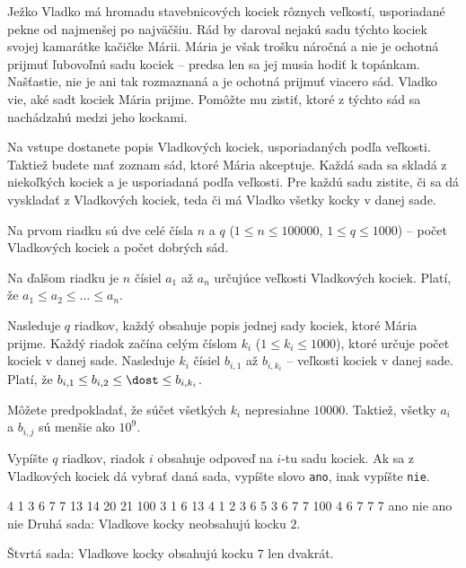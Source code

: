 




Ježko Vladko má hromadu stavebnicových kociek rôznych veľkostí, usporiadané pekne od najmenšej po
najväčšiu. Rád by daroval nejakú sadu týchto kociek svojej kamarátke kačičke Márii. Mária je však
trošku náročná a nie je ochotná prijmuť ľubovoľnú sadu kociek -- predsa len sa jej musia hodiť k
topánkam. Našťastie, nie je ani tak rozmaznaná a je ochotná prijmuť viacero sád. Vladko vie, aké
sadt kociek Mária prijme. Pomôžte mu zistiť, ktoré z týchto sád sa nachádzahú medzi jeho kockami.


Na vstupe dostanete popis Vladkových kociek, usporiadaných podľa veľkosti. Taktiež budete mať zoznam
sád, ktoré Mária akceptuje. Každá sada sa skladá z niekoľkých kociek a je usporiadaná podľa veľkosti.
Pre každú sadu zistite, či sa dá vyskladať z Vladkových kociek, teda či má Vladko všetky kocky v
danej sade.


Na prvom riadku sú dve celé čísla $n$ a $q$ ($1 \leq n \leq 100000$, $1 \leq q \leq 1000$) -- počet
Vladkových kociek a počet dobrých sád.

Na ďalšom riadku je $n$ čísiel $a_1$ až $a_n$ určujúce veľkosti Vladkových kociek. Platí, že $a_1
\leq a_2 \leq \dots \leq a_n$.

Nasleduje $q$ riadkov, každý obsahuje popis jednej sady kociek, ktoré Mária prijme. Každý riadok
začína celým číslom $k_i$ ($1 \leq k_i \leq 1000$), ktoré určuje počet kociek v danej sade. Nasleduje $k_i$ čísiel
$b_{i,1}$  až $b_{i,k_i}$ -- veľkosti kociek v danej sade. Platí, že $b_{i,1} \leq b_{i,2} \leq \dost
\leq b_{i,k_i}$.

Môžete predpokladať, že súčet všetkých $k_i$ nepresiahne $10000$. Taktiež, všetky $a_i$ a $b_{i,j}$
sú menšie ako $10^9$.


Vypíšte $q$ riadkov, riadok $i$ obsahuje odpoveď na $i$-tu sadu kociek. Ak sa z Vladkových kociek dá
vybrať daná sada, vypíšte slovo \texttt{ano}, inak vypíšte \texttt{nie}.


 4
1 3 6 7 7 13 14 20 21 100
3 1 6 13
4 1 2 3 6
5 3 6 7 7 100
4 6 7 7 7
\vystup
ano
nie
ano
nie
\komentar
Druhá sada: Vladkove kocky neobsahujú kocku $2$.

Štvrtá sada: Vladkove kocky obsahujú kocku $7$ len dvakrát.
\koniec


